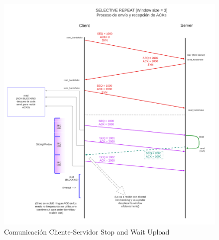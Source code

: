 \documentclass[11pt,a4paper]{article}
\begin{document}
\begin{figure}[H]
    \centering
    \begin{center}
    \includegraphics[width=17cm]
    {images/implementacion/Proceso_send_and_recv_de_ACKs_SRepeat.png}
    \end{center}
    \caption{Comunicación Cliente-Servidor Stop and Wait Upload}
\end{figure}

\newpage
\end{document}
